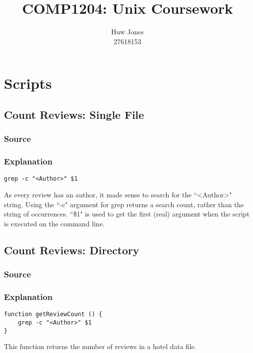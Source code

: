 \documentclass[a4paper]{article}
\author{Huw Jones \\27618153}
\title{COMP1204: Unix Coursework}
\begin{document}
\maketitle
\newpage

\section{Scripts}

%
\subsection{Count Reviews: Single File}

\subsubsection{Source}



\subsubsection{Explanation}

\begin{lstlisting}
grep -c "<Author>" $1
\end{lstlisting}
As every review has an author, it made sense to search for the ``\textless Author\textgreater" string.
Using the ``-c" argument for grep returns a search count, rather than the string of occurrences.
``\$1" is used to get the first (real) argument when the script is executed on the command line.

%
\subsection{Count Reviews: Directory}

\subsubsection{Source}



\subsubsection{Explanation}

\begin{lstlisting}
function getReviewCount () {
	grep -c "<Author>" $1
}
\end{lstlisting}
This function returns the number of reviews in a hotel data file.
\end{document}
